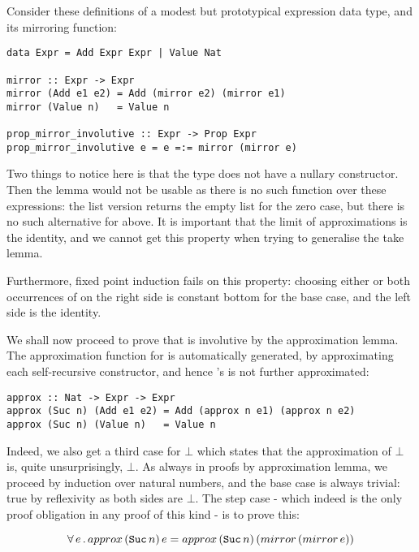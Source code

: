 Consider these definitions of a modest but prototypical expression
data type, and its mirroring function:

\begin{verbatim}
data Expr = Add Expr Expr | Value Nat

mirror :: Expr -> Expr
mirror (Add e1 e2) = Add (mirror e2) (mirror e1)
mirror (Value n)   = Value n

prop_mirror_involutive :: Expr -> Prop Expr
prop_mirror_involutive e = e =:= mirror (mirror e)
\end{verbatim}

Two things to notice here is that the type  does not have a
nullary constructor. Then the  lemma would not be usable as
there is no such function over these expressions: the list version
returns the empty list \hs{[]} for the zero case, but there is no such
alternative for  above. It is important that the limit of
approximations is the identity, and we cannot get this property when
trying to generalise the take lemma.

Furthermore, fixed point induction fails on this property: choosing
either or both occurrences of  on the right side is
constant bottom for the base case, and the left side is the identity.


We shall now proceed to prove that  is involutive by the
approximation lemma. The approximation function for  is
automatically generated, by approximating each self-recursive
constructor, and hence 's  is not further approximated:

\begin{verbatim}
approx :: Nat -> Expr -> Expr
approx (Suc n) (Add e1 e2) = Add (approx n e1) (approx n e2)
approx (Suc n) (Value n)   = Value n
\end{verbatim}

Indeed, we also get a third case for $\bot$ which states that the
approximation of $\bot$ is, quite unsurprisingly, $\bot$.
As always in proofs by approximation lemma, we proceed by induction
over natural numbers, and the base case is always trivial: true by
reflexivity as both sides are $\bot$. The step case - which indeed is
the only proof obligation in any proof of this kind - is to prove
this:

\begin{equation*}
\fa{e}  approx \, (\hs{Suc} \, n) \, e = approx \, (\hs{Suc} \, n) \, (mirror \, (mirror \, e))
\end{equation*}

